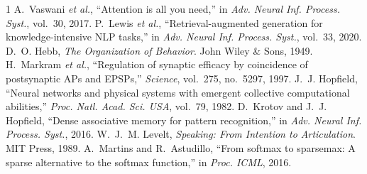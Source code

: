 \documentclass[journal]{IEEEtran}
\begin{document}

\begin{thebibliography}{1}
 A.~Vaswani \textit{et al.}, ``Attention is all you need,'' in \textit{Adv. Neural Inf. Process. Syst.}, vol.~30, 2017.
 P.~Lewis \textit{et al.}, ``Retrieval-augmented generation for knowledge-intensive NLP tasks,'' in \textit{Adv. Neural Inf. Process. Syst.}, vol.~33, 2020.
 D.~O. Hebb, \textit{The Organization of Behavior}. John Wiley \& Sons, 1949.
 H.~Markram \textit{et al.}, ``Regulation of synaptic efficacy by coincidence of postsynaptic APs and EPSPs,'' \textit{Science}, vol.~275, no.~5297, 1997.
 J.~J. Hopfield, ``Neural networks and physical systems with emergent collective computational abilities,'' \textit{Proc. Natl. Acad. Sci. USA}, vol.~79, 1982.
 D.~Krotov and J.~J. Hopfield, ``Dense associative memory for pattern recognition,'' in \textit{Adv. Neural Inf. Process. Syst.}, 2016.
 W.~J.~M. Levelt, \textit{Speaking: From Intention to Articulation}. MIT Press, 1989.
 A.~Martins and R.~Astudillo, ``From softmax to sparsemax: A sparse alternative to the softmax function,'' in \textit{Proc. ICML}, 2016.
\end{thebibliography}
\end{document}
